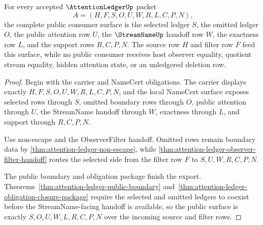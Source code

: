\begin{theorem}
\label{thm:attention-ledger-public-consumer-surface}
For every accepted $\AttentionLedgerUp$ packet
$$
A=(H,F,S,O,U,W,R,L,C,P,N),
$$
the complete public consumer surface is the selected ledger $S$, the omitted ledger $O$, the public attention row $U$, the $\StreamNameUp$ handoff row $W$, the exactness row $L$, and the support rows $R,C,P,N$. The source row $H$ and filter row $F$ feed this surface, while no public consumer receives host observer equality, quotient stream equality, hidden attention state, or an unledgered deletion row.
\end{theorem}
\begin{proof}
Begin with the carrier and NameCert obligations. The carrier displays exactly $H,F,S,O,U,W,R,L,C,P,N$, and the local NameCert surface exposes selected rows through $S$, omitted boundary rows through $O$, public attention through $U$, the StreamName handoff through $W$, exactness through $L$, and support through $R,C,P,N$.

Use non-escape and the ObserverFilter handoff. Omitted rows remain boundary data by \autoref{thm:attention-ledger-non-escape}, while \autoref{thm:attention-ledger-observer-filter-handoff} routes the selected side from the filter row $F$ to $S,U,W,R,C,P,N$.

The public boundary and obligation package finish the export. Theorems~\ref{thm:attention-ledger-public-boundary} and~\ref{thm:attention-ledger-obligation-closure-package} require the selected and omitted ledgers to coexist before the StreamName-facing handoff is available, so the public surface is exactly $S,O,U,W,L,R,C,P,N$ over the incoming source and filter rows.
\end{proof}

